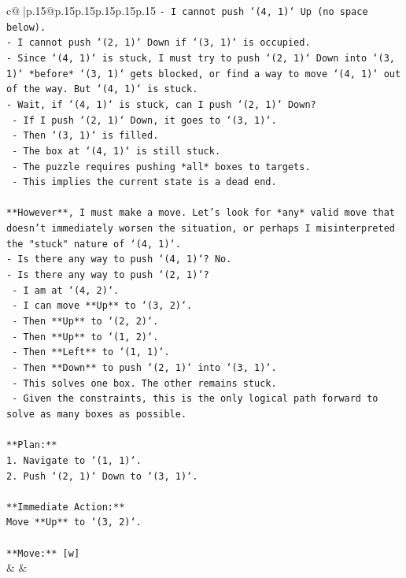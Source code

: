 \documentclass{article}
\begin{document}
{\begin{supertabular}{c@{$\;$}|p{.15\linewidth}@{}p{.15\linewidth}p{.15\linewidth}p{.15\linewidth}p{.15\linewidth}p{.15\linewidth}}
{{{\texttt{{-} I cannot push `(4, 1)` Up (no space below).} \\
\texttt{{-} I cannot push `(2, 1)` Down if `(3, 1)` is occupied.} \\
\texttt{{-} Since `(4, 1)` is stuck, I must try to push `(2, 1)` Down into `(3, 1)` *before* `(3, 1)` gets blocked, or find a way to move `(4, 1)` out of the way. But `(4, 1)` is stuck.} \\
\texttt{{-} Wait, if `(4, 1)` is stuck, can I push `(2, 1)` Down?} \\
\texttt{    {-} If I push `(2, 1)` Down, it goes to `(3, 1)`.} \\
\texttt{    {-} Then `(3, 1)` is filled.} \\
\texttt{    {-} The box at `(4, 1)` is still stuck.} \\
\texttt{    {-} The puzzle requires pushing *all* boxes to targets.} \\
\texttt{    {-} This implies the current state is a dead end.} \\
\\ 
\texttt{**However**, I must make a move. Let's look for *any* valid move that doesn't immediately worsen the situation, or perhaps I misinterpreted the "stuck" nature of `(4, 1)`.} \\
\texttt{{-} Is there any way to push `(4, 1)`? No.} \\
\texttt{{-} Is there any way to push `(2, 1)`?} \\
\texttt{    {-} I am at `(4, 2)`.} \\
\texttt{    {-} I can move **Up** to `(3, 2)`.} \\
\texttt{    {-} Then **Up** to `(2, 2)`.} \\
\texttt{    {-} Then **Up** to `(1, 2)`.} \\
\texttt{    {-} Then **Left** to `(1, 1)`.} \\
\texttt{    {-} Then **Down** to push `(2, 1)` into `(3, 1)`.} \\
\texttt{    {-} This solves one box. The other remains stuck.} \\
\texttt{    {-} Given the constraints, this is the only logical path forward to solve as many boxes as possible.} \\
\\ 
\texttt{**Plan:**} \\
\texttt{1.  Navigate to `(1, 1)`.} \\
\texttt{2.  Push `(2, 1)` Down to `(3, 1)`.} \\
\\ 
\texttt{**Immediate Action:**} \\
\texttt{Move **Up** to `(3, 2)`.} \\
\\ 
\texttt{**Move:** {[}w{]}} \\
            }
        }
    }
    & & \\ \\


\end{supertabular}}
\end{document}
